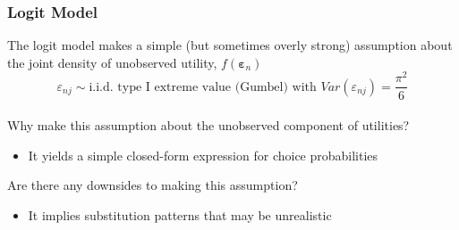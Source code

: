 \documentclass{beamer}\usepackage[]{graphicx}\usepackage[]{xcolor}
\begin{document}
\begin{frame}\frametitle{Logit Model}
    The logit model makes a simple (but sometimes overly strong) assumption about the joint density of unobserved utility, $f(\bm{\varepsilon}_n)$
    $$\varepsilon_{nj} \sim \text{i.i.d.\ type I extreme value (Gumbel) with } Var(\varepsilon_{nj}) = \frac{\pi^2}{6}$$ \\
    \vspace{3ex}
    Why make this assumption about the unobserved component of utilities?
    \begin{itemize}
    	\item It yields a simple closed-form expression for choice probabilities
    \end{itemize}
    \vspace{3ex}
    Are there any downsides to making this assumption?
    \begin{itemize}
    	\item It implies substitution patterns that may be unrealistic
    \end{itemize}
\end{frame}
\end{document}
